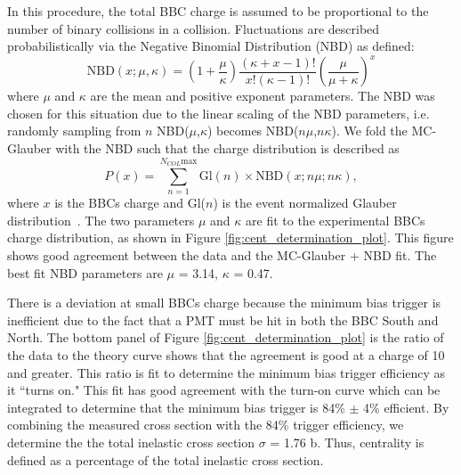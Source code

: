 In this procedure, the total BBC charge is assumed to be proportional to the number of binary collisions in a \pau collision. Fluctuations are described probabilistically via the Negative Binomial Distribution (NBD) as defined:
\begin{equation}
   \textrm{NBD}(x;\mu,\kappa) = \left(1+\frac{\mu}{\kappa}\right)\frac{(\kappa+x-1)!}{x!(\kappa-1)!}\left(\frac{\mu}{\mu+\kappa}\right)^x
\end{equation}
where $\mu$ and $\kappa$ are the mean and positive exponent parameters. The NBD was chosen for this situation due to the linear scaling of the NBD parameters, i.e. randomly sampling from $n$ NBD($\mu$,$\kappa$) becomes NBD($n\mu$,$n\kappa$). We fold the MC-Glauber with the NBD such that the charge distribution is described as
\begin{equation}
   P(x) = \sum^{N_{COL}\textrm{max}}_{n=1} \textrm{Gl}(n)\times \textrm{NBD}(x;n\mu;n\kappa),
\end{equation}
where $x$ is the BBCs charge and Gl($n$) is the event normalized Glauber distribution~\cite{PhysRevC.90.034902}. The two parameters $\mu$ and $\kappa$ are fit to the experimental BBCs charge distribution, as shown in Figure \ref{fig:cent_determination_plot}. This figure shows good agreement between the data and the MC-Glauber + NBD fit. The best fit NBD parameters are $\mu$ = 3.14, $\kappa$ = 0.47. 

There is a deviation at small BBCs charge because the minimum bias trigger is inefficient due to the fact that a PMT must be hit in both the BBC South and North. The bottom panel of Figure \ref{fig:cent_determination_plot} is the ratio of the data to the theory curve shows that the agreement is good at a charge of 10 and greater. This ratio is fit to determine the minimum bias trigger efficiency as it ``turns on." This fit has good agreement with the turn-on curve which can be integrated to determine that the minimum bias trigger is 84\% $\pm$ 4\% efficient. By combining the measured \pau cross section with the 84\% trigger efficiency, we determine the the total inelastic \pau cross section $\sigma$ = 1.76 b. Thus, centrality is defined as a percentage of the total inelastic cross section.


